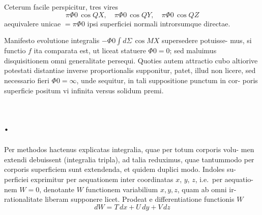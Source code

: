 \documentclass[12pt,a4paper]{article}
\theoremstyle{gauss}
\begin{document}
Ceterum facile perspicitur, tres vires
\[
\pi\Phi 0\,\cos QX,\quad \pi\Phi 0\,\cos QY,\quad \pi\Phi 0\,\cos QZ
\]
aequivalere unicae $=\pi\Phi 0$ ipsi superficiei normali introrsumque directae.

Manifesto evolutione integralis $-\Phi 0\int d\Sigma\,\cos MX$ supersedere potuisse-
mus, si functio $f$ ita comparata est, ut liceat statuere $\Phi 0=0$; sed maluimus
disquisitionem omni generalitate persequi. Quoties autem attractio cubo altiorive
potestati distantiae inverse proportionalis supponitur, patet, illud non licere, sed
necessario fieri $\Phi 0=\infty$, unde sequitur, in tali suppositione punctum in cor-
poris superficie positum vi infinita versus solidum premi.

\section*{%
%
\thesection.}

Per methodos hactenus explicatas integralia, quae per totum corporis volu-
men extendi debuissent (integralia tripla), ad talia reduximus, quae tantummodo
per corporis superficiem sunt extendenda, et quidem duplici modo. Indoles su-
perficiei exprimitur per aequationem inter coordinatas $x$, $y$, $z$, i.e.~per aequatio-
nem $W=0$, denotante $W$ functionem variabilium $x,y,z$, quam ab omni ir-
rationalitate liberam supponere licet. Prodeat e differentiatione functionis $W$
\[
dW = T\,dx + U\,dy + V\,dz
\]

\newpage
\setcounter{page}{20}
\end{document}
